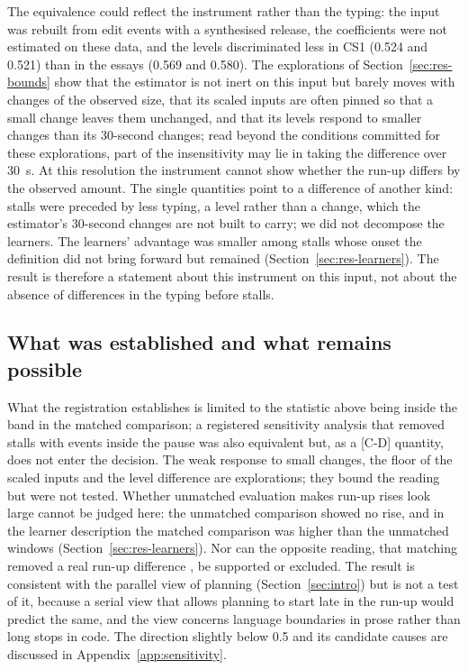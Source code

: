 The equivalence could reflect the instrument rather than the typing: the input was rebuilt from edit events with a
synthesised release, the coefficients were not estimated on these data, and the levels discriminated less in CS1 (0.524
and 0.521) than in the essays (0.569 and 0.580). The explorations of Section~\ref{sec:res-bounds} show that the estimator is not inert on this input but barely moves
with changes of the observed size, that its scaled inputs are often pinned so that a small change leaves them
unchanged, and that its levels respond to smaller changes than its 30-second changes; read beyond the conditions
committed for these explorations, part of the insensitivity may lie in taking the difference over 30~s. At this resolution the instrument cannot show whether the run-up differs by the
observed amount. The single quantities point to a difference of another kind: stalls were
preceded by less typing, a level rather than a change, which the estimator's 30-second changes are not built to carry;
we did not decompose the learners. The learners' advantage was smaller among stalls whose onset the definition did not
bring forward but remained (Section~\ref{sec:res-learners}). The result is therefore a
statement about this instrument on this input, not about the absence of differences in the typing before stalls.

\subsection{What was established and what remains possible}

What the registration establishes is limited to the statistic above being inside the band in the matched comparison;
a registered sensitivity analysis that removed stalls with events inside the pause was also equivalent but, as a [C-D]
quantity, does not enter the decision. The weak response to small changes, the floor of
the scaled inputs and the level difference are explorations; they bound the reading but were not tested. Whether unmatched evaluation makes run-up rises look large
cannot be judged here: the unmatched comparison showed no rise, and in the learner description the matched comparison
was higher than the unmatched windows (Section~\ref{sec:res-learners}). Nor can the opposite reading, that matching
removed a real run-up difference \cite{mansournia2018case}, be supported or excluded. The result is consistent with the
parallel view of planning (Section~\ref{sec:intro}) but is not a test of it, because a serial view that allows planning
to start late in the run-up would predict the same, and the view concerns language boundaries in prose rather than long
stops in code. The direction slightly below 0.5 and its candidate causes are
discussed in Appendix~\ref{app:sensitivity}.

